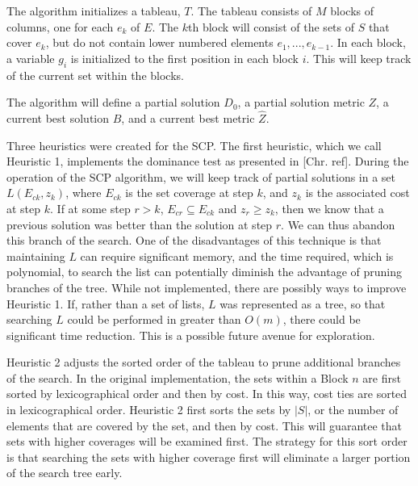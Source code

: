 \documentclass[12pt]{article}
\begin{document}
	The algorithm initializes a tableau, $T$. The tableau consists of $M$ blocks of columns, one for each $e_k$ of $E$. The $k$th block will consist of the sets of $S$ that cover $e_k$, but do not contain lower numbered elements $e_1,...,e_{k-1}$. In each block, a variable $g_i$ is initialized to the first position in each block $i$. This will keep track of the current set within the blocks.
	
	The algorithm will define a partial solution $D_0$, a partial solution metric $Z$, a current best solution $\hat{B}$, and a current best metric $\hat{Z}$.
	
	
	Three heuristics were created for the SCP. The first heuristic, which we call Heuristic 1, implements the dominance test as presented in [Chr. ref]. During the operation of the SCP algorithm, we will keep track of partial solutions in a set $L(E_{ck}, z_k)$, where $E_{ck}$ is the set coverage at step $k$, and $z_k$ is the associated cost at step $k$. If at some step $r > k$, $E_{cr} \subseteq E_{ck}$ and $z_r \geq z_k$, then we know that a previous solution was better than the solution at step $r$. We can thus abandon this branch of the search. One of the disadvantages of this technique is that maintaining $L$ can require significant memory, and the time required, which is polynomial, to search the list can potentially diminish the advantage of pruning branches of the tree. While not implemented, there are possibly ways to improve Heuristic 1. If, rather than a set of lists, $L$ was represented as a tree, so that searching $L$ could be performed in greater than $O(m)$, there could be significant time reduction. This is a possible future avenue for exploration.
	
	Heuristic 2 adjusts the sorted order of the tableau to prune additional branches of the search. In the original implementation, the sets within a Block $n$ are first sorted by lexicographical order and then by cost. In this way, cost ties are sorted in lexicographical order. Heuristic 2 first sorts the sets by $|S|$, or the number of elements that are covered by the set, and then by cost. This will guarantee that sets with higher coverages will be examined first. The strategy for this sort order is that searching the sets with higher coverage first will eliminate a larger portion of the search tree early.
	
\end{document}
